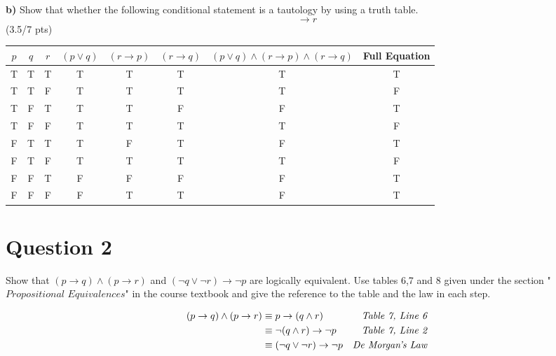 \documentclass[a4paper,12pt]{article}
\newcommand\tab[1][1cm]{\hspace*{#1}}
\begin{document}
\tab \textbf{b)} Show that whether the following conditional statement is a tautology by using a truth table.
\begin{equation*}
    [(p \vee q) \wedge (r \rightarrow p) \wedge (r \rightarrow q)] \rightarrow r
\end{equation*}
\hfill \small{(3.5/7 pts)}\\
\begin{tcolorbox}
\begin{center}
    \begin{tabular}{||c|c|c|c|c|c|c|c||} 
    
    \hline
    $p$ & $q$ & $r$ & $(p\lor q)$ & $(r \rightarrow p)$ & $(r \rightarrow q)$
    & $(p\lor q) \land  (r \rightarrow p) \land (r \rightarrow q)$ & Full Equation \\ [2.0ex]
    \hline
    T & T & T & T & T & T & T & T \\ [0.2ex]
    \hline
    T & T & F & T & T & T & T & F \\ [0.2ex]
    \hline 
    T & F & T & T & T & F & F & T\\ [0.2ex]
    \hline
    T & F & F & T & T & T & T & F \\ [0.2ex]
    \hline
    F & T & T & T & F & T & F & T \\ [0.2ex]
    \hline
    F & T & F & T & T & T & T & F \\ [0.2ex]
    \hline
    F & F & T & F & F & F & F & T \\ [0.2ex]
    \hline
    F & F & F & F & T & T & F & T \\ [0.2ex]
    \hline
    \end{tabular}

\end{center}

\end{tcolorbox}

\newpage
\section*{Question 2 \hfill {}}
\tab Show that $(p \rightarrow q) \wedge (p \rightarrow r)$ and $(\neg q \vee \neg r)\rightarrow \neg p$ are logically equivalent. Use tables 6,7 and 8 given under the section "$\textit{Propositional Equivalences}$" in the course textbook and give the reference to the table and the law in each step.

\begin{tcolorbox}
\begin{align*}
    (p\rightarrow q) \land (p \rightarrow r) & \equiv p \rightarrow (q \land r) & \textit{Table 7, Line 6} \\ 
    &\equiv \neg (q \land r) \rightarrow \neg p &\textit{Table 7, Line 2} \\
    &\equiv (\neg q \lor \neg r) \rightarrow \neg p &\textit{De Morgan's Law} 
\vspace{1cm} %
\end{align*}
\end{tcolorbox}
\end{document}
